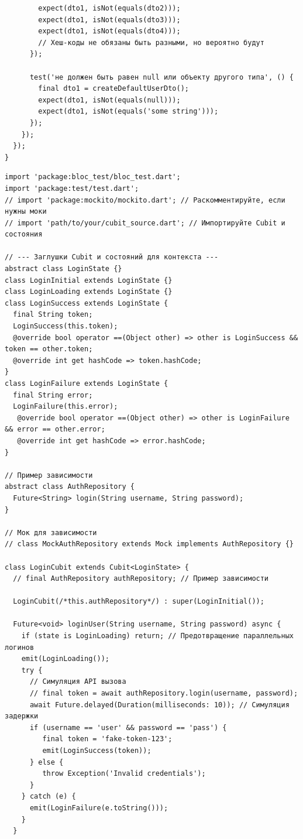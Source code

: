 \documentclass[14pt, russian]{scrartcl}
\begin{document}
\begin{verbatim}
        expect(dto1, isNot(equals(dto2)));
        expect(dto1, isNot(equals(dto3)));
        expect(dto1, isNot(equals(dto4)));
        // Хеш-коды не обязаны быть разными, но вероятно будут
      });

      test('не должен быть равен null или объекту другого типа', () {
        final dto1 = createDefaultUserDto();
        expect(dto1, isNot(equals(null)));
        expect(dto1, isNot(equals('some string')));
      });
    });
  });
}
\end{verbatim}

\caption{Пример сгенерированного теста для Cubit (Dart, bloc\_test)}
\hspace*{-10pt}\label{lst:cubit_test_example}
\begin{verbatim}
import 'package:bloc_test/bloc_test.dart';
import 'package:test/test.dart';
// import 'package:mockito/mockito.dart'; // Раскомментируйте, если нужны моки
// import 'path/to/your/cubit_source.dart'; // Импортируйте Cubit и состояния

// --- Заглушки Cubit и состояний для контекста ---
abstract class LoginState {}
class LoginInitial extends LoginState {}
class LoginLoading extends LoginState {}
class LoginSuccess extends LoginState {
  final String token;
  LoginSuccess(this.token);
  @override bool operator ==(Object other) => other is LoginSuccess && token == other.token;
  @override int get hashCode => token.hashCode;
}
class LoginFailure extends LoginState {
  final String error;
  LoginFailure(this.error);
   @override bool operator ==(Object other) => other is LoginFailure && error == other.error;
   @override int get hashCode => error.hashCode;
}

// Пример зависимости
abstract class AuthRepository {
  Future<String> login(String username, String password);
}

// Мок для зависимости
// class MockAuthRepository extends Mock implements AuthRepository {}

class LoginCubit extends Cubit<LoginState> {
  // final AuthRepository authRepository; // Пример зависимости

  LoginCubit(/*this.authRepository*/) : super(LoginInitial());

  Future<void> loginUser(String username, String password) async {
    if (state is LoginLoading) return; // Предотвращение параллельных логинов
    emit(LoginLoading());
    try {
      // Симуляция API вызова
      // final token = await authRepository.login(username, password);
      await Future.delayed(Duration(milliseconds: 10)); // Симуляция задержки
      if (username == 'user' && password == 'pass') {
         final token = 'fake-token-123';
         emit(LoginSuccess(token));
      } else {
         throw Exception('Invalid credentials');
      }
    } catch (e) {
      emit(LoginFailure(e.toString()));
    }
  }


\end{verbatim}
\end{document}
